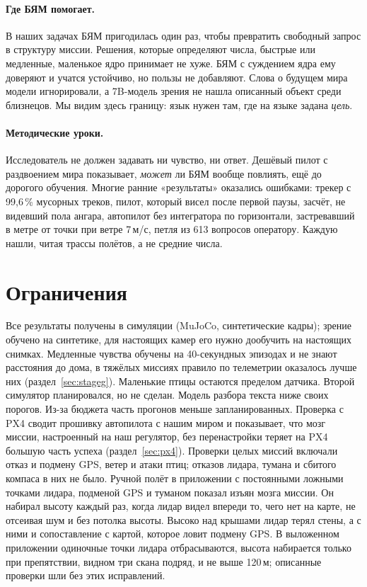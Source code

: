 \documentclass[10pt]{article}
\begin{document}
\paragraph{Где БЯМ помогает.} В наших задачах БЯМ пригодилась один раз, чтобы превратить свободный запрос в структуру миссии.
Решения, которые определяют числа, быстрые или медленные, маленькое ядро принимает не хуже. БЯМ с суждением ядра ему доверяют и
учатся устойчиво, но пользы не добавляют. Слова о будущем мира модели игнорировали, а 7B-модель зрения не нашла описанный объект
среди близнецов. Мы видим здесь границу: язык нужен там, где на языке задана \emph{цель}.
\paragraph{Методические уроки.} Исследователь не должен задавать ни чувство, ни ответ. Дешёвый пилот с раздвоением мира
показывает, \emph{может} ли БЯМ вообще повлиять, ещё до дорогого обучения. Многие ранние «результаты» оказались ошибками: трекер
с 99,6\,\% мусорных треков, пилот, который висел после первой паузы, засчёт, не видевший пола ангара, автопилот без интегратора по
горизонтали, застревавший в метре от точки при ветре 7\,м/с, петля из 613 вопросов оператору. Каждую нашли, читая трассы полётов,
а не средние числа.

\section{Ограничения}
Все результаты получены в симуляции (MuJoCo, синтетические кадры); зрение обучено на синтетике, для настоящих камер его нужно
дообучить на настоящих снимках. Медленные чувства обучены на 40-секундных эпизодах и не знают расстояния до дома, в тяжёлых миссиях
правило по телеметрии оказалось лучше них (раздел~\ref{sec:stageg}). Маленькие птицы
остаются пределом датчика. Второй симулятор планировался, но не сделан. Модель разбора текста ниже своих порогов. Из-за бюджета
часть прогонов меньше запланированных. Проверка с PX4 сводит прошивку автопилота с нашим миром и показывает, что мозг миссии,
настроенный на наш регулятор, без перенастройки теряет на PX4 большую часть успеха (раздел~\ref{sec:px4}). Проверки целых миссий
включали отказ и подмену GPS, ветер и атаки птиц; отказов лидара, тумана и сбитого компаса в них не было. Ручной полёт в приложении
с постоянными ложными точками лидара, подменой GPS и туманом показал изъян мозга миссии. Он набирал высоту каждый раз, когда лидар
видел впереди то, чего нет на карте, не отсеивая шум и без потолка высоты. Высоко над крышами лидар терял стены, а с ними и
сопоставление с картой, которое ловит подмену GPS. В выложенном приложении одиночные точки лидара отбрасываются, высота набирается
только при препятствии, видном три скана подряд, и не выше 120\,м; описанные проверки шли без этих исправлений.
\end{document}
